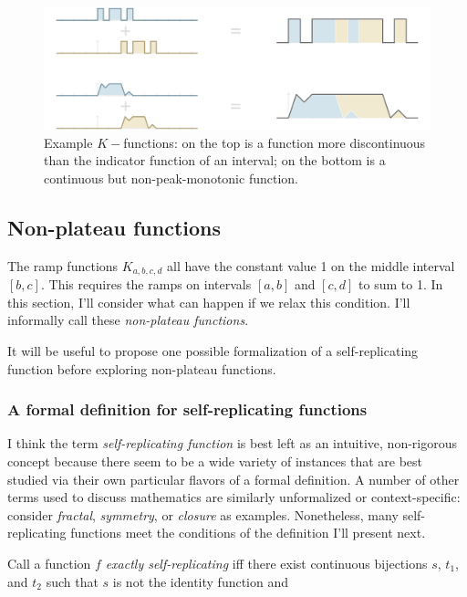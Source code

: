 \documentclass[20pt,]{extarticle}
\begin{document}
\begin{figure}
\centering
\includegraphics{images/other_ramps2.png}
\caption{Example \(K-\)functions: on the top is a function more
discontinuous than the indicator function of an interval; on the bottom
is a continuous but non-peak-monotonic function.}\label{fig:other_ramps}
\end{figure}

\subsection{Non-plateau functions}\label{non-plateau-functions}

The ramp functions \(K_{a,b,c,d}\) all have the constant value 1 on the
middle interval \([b, c]\). This requires the ramps on intervals
\([a, b]\) and \([c, d]\) to sum to 1. In this section, I'll consider
what can happen if we relax this condition. I'll informally call these
\emph{non-plateau functions}.

It will be useful to propose one possible formalization of a
self-replicating function before exploring non-plateau functions.

\subsubsection{A formal definition for self-replicating
functions}\label{a-formal-definition-for-self-replicating-functions}

I think the term \emph{self-replicating function} is best left as an
intuitive, non-rigorous concept because there seem to be a wide variety
of instances that are best studied via their own particular flavors of a
formal definition. A number of other terms used to discuss mathematics
are similarly unformalized or context-specific: consider \emph{fractal},
\emph{symmetry}, or \emph{closure} as examples. Nonetheless, many
self-replicating functions meet the conditions of the definition I'll
present next.

Call a function \(f\) \emph{exactly self-replicating} iff there exist
continuous bijections \(s\), \(t_1\), and \(t_2\) such that \(s\) is not
the identity function and
\end{document}

